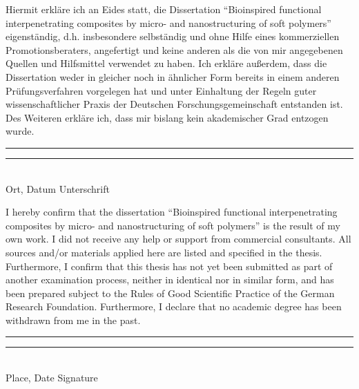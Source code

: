 \vspace{1cm}
Hiermit erkläre ich an Eides statt, die Dissertation ``Bioinspired functional interpenetrating composites by micro- and nanostructuring of soft polymers'' eigenständig, d.h. insbesondere selbständig und ohne Hilfe eines kommerziellen Promotionsberaters, angefertigt und keine anderen als die von mir angegebenen Quellen und Hilfsmittel verwendet zu haben. Ich erkläre außerdem, dass die Dissertation weder in gleicher noch in ähnlicher Form bereits in einem anderen Prüfungsverfahren vorgelegen hat und unter Einhaltung der Regeln guter wissenschaftlicher Praxis der Deutschen Forschungsgemeinschaft entstanden ist. Des Weiteren erkläre ich, dass mir bislang kein akademischer Grad entzogen wurde.

\vspace{2cm}
\rule{5cm}{0.2pt} \hspace{4cm} \rule{5cm}{0.2pt}\\ 
\hspace*{1.5cm} Ort, Datum \hspace{7cm} Unterschrift
\vspace{2cm}

I hereby confirm that the dissertation ``Bioinspired functional interpenetrating composites by micro- and nanostructuring of soft polymers'' is the result of my own work. I did not receive any help or support from commercial consultants. All sources and/or materials applied here are listed and specified in the thesis. Furthermore, I confirm that this thesis has not yet been submitted as part of another examination process, neither in identical nor in similar form, and has been prepared subject to the Rules of Good Scientific Practice of the German Research Foundation. Furthermore, I declare that no academic degree has been withdrawn from me in the past.

\vspace{2cm}
\rule{5cm}{0.2pt} \hspace{4cm} \rule{5cm}{0.2pt}\\ 
\hspace*{1.5cm} Place, Date \hspace{7.2cm} Signature
